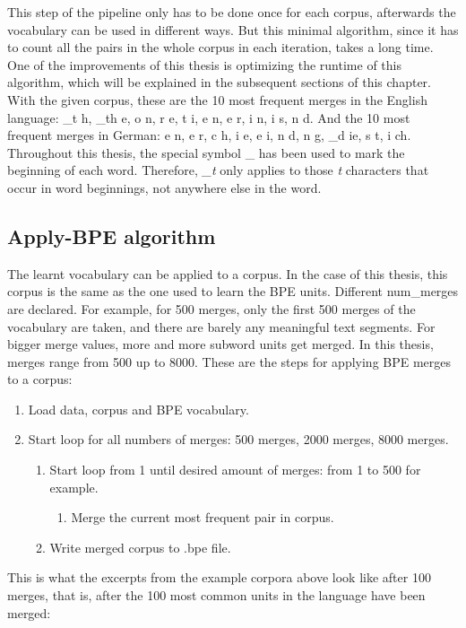 This step of the pipeline only has to be done once for each corpus, afterwards the vocabulary can be used in different ways. But this minimal algorithm, since it has to count all the pairs in the whole corpus in each iteration, takes a long time. One of the improvements of this thesis is optimizing the runtime of this algorithm, which will be explained in the subsequent sections of this chapter. With the given corpus, these are the 10 most frequent merges in the English language: \_t h, \_th e, o n, r e, t i, e n, e r, i n, i s, n d. And the 10 most frequent merges in German: e n, e r, c h, i e, e i, n d, n g, \_d ie, s t, i ch. Throughout this thesis, the special symbol \_ has been used to mark the beginning of each word. Therefore, \emph{\_t} only applies to those \emph{t} characters that occur in word beginnings, not anywhere else in the word.

\subsection{Apply-BPE algorithm}\label{met:applybpe}

The learnt vocabulary can be applied to a corpus. In the case of this thesis, this corpus is the same as the one used to learn the BPE units. Different num\_merges are declared. For example, for 500 merges, only the first 500 merges of the vocabulary are taken, and there are barely any meaningful text segments. For bigger merge values, more and more subword units get merged. In this thesis, merges range from 500 up to 8000. These are the steps for applying BPE merges to a corpus:

\begin{enumerate}
	\item Load data, corpus and BPE vocabulary.
	\item Start loop for all numbers of merges: 500 merges, 2000 merges, 8000 merges.
	\begin{enumerate}
		\item Start loop from 1 until desired amount of merges: from 1 to 500 for example.
		\begin{enumerate}
			\item Merge the current most frequent pair in corpus.
		\end{enumerate}
		\item Write merged corpus to .bpe file.
	\end{enumerate}
\end{enumerate}

This is what the excerpts from the example corpora above look like after 100 merges, that is, after the 100 most common units in the language have been merged:

